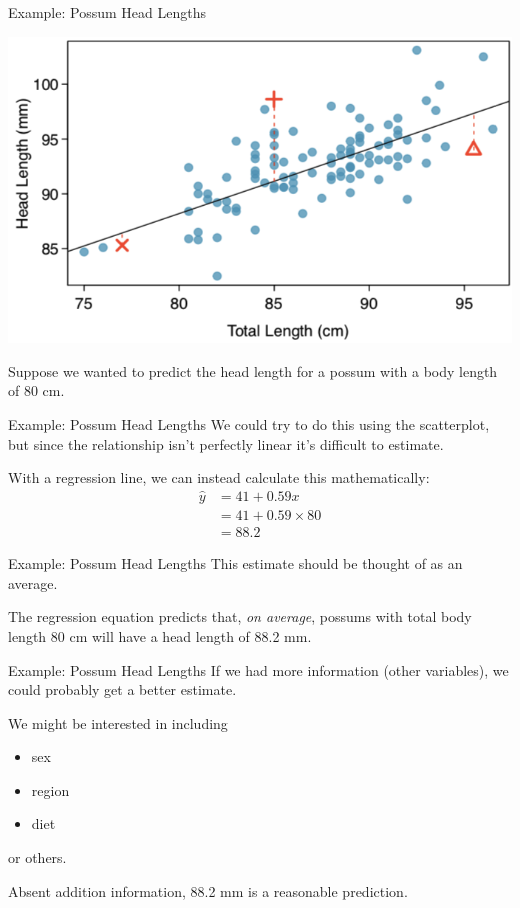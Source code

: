 \begin{frame}{Example: Possum Head Lengths}
    \begin{center}
        \includegraphics[scale=0.35]{images/possreg.png}
    \end{center}
    Suppose we wanted to predict the head length for a possum with a body length of 80 cm. 
\end{frame}

\begin{frame}{Example: Possum Head Lengths}
    We could try to do this using the scatterplot, but since the relationship isn't perfectly linear it's difficult to estimate.
    
    \vspace{12pt}With a regression line, we can instead calculate this mathematically:
    \begin{align*}
        \hat{y} &= 41 + 0.59x \\
                &= 41 + 0.59 \times 80 \\
                &= 88.2
    \end{align*}
\end{frame}

\begin{frame}{Example: Possum Head Lengths}
    This estimate should be thought of as an average.
    
    \vspace{12pt}The regression equation predicts that, \textit{on average}, possums with total body length 80 cm will have a head length of 88.2 mm. 
\end{frame}

\begin{frame}{Example: Possum Head Lengths}
    If we had more information (other variables), we could probably get a better estimate. 
    
    \vspace{12pt}We might be interested in including
    \begin{itemize}
        \item sex
        \item region
        \item diet
    \end{itemize}
    or others.
    
    \vspace{12pt}Absent addition information, 88.2 mm is a reasonable prediction.
\end{frame}

